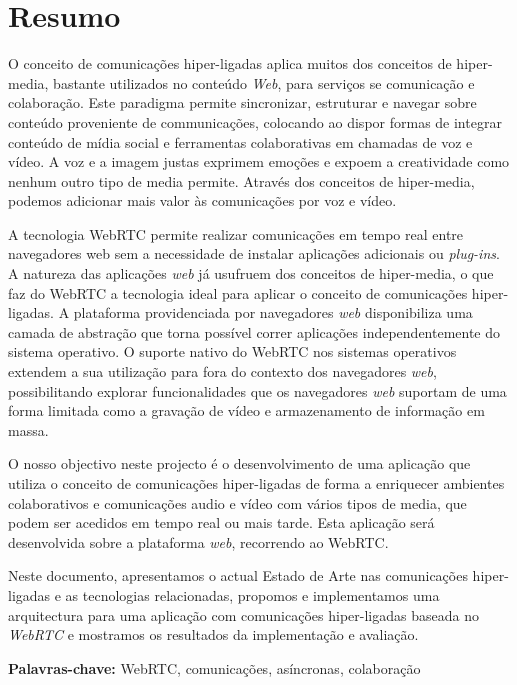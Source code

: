 \chapter*{Resumo}


O conceito de comunicações hiper-ligadas aplica muitos dos conceitos de hiper-media, bastante utilizados no conteúdo \emph{Web}, para serviços se comunicação e colaboração. Este paradigma permite sincronizar, estruturar e navegar sobre conteúdo proveniente de communicações, colocando ao dispor formas de integrar conteúdo de mídia social e ferramentas colaborativas em chamadas de voz e vídeo.
A voz e a imagem justas exprimem emoções e expoem a creatividade como nenhum outro tipo de media permite. Através dos conceitos de hiper-media, podemos adicionar mais valor às comunicações por voz e vídeo.

A tecnologia \ac{WebRTC} permite realizar comunicações em tempo real entre navegadores web sem a necessidade de instalar aplicações adicionais ou \emph{plug-ins}. A natureza das aplicações \emph{web} já usufruem dos conceitos de hiper-media, o que faz do \ac{WebRTC} a tecnologia ideal para aplicar o conceito de comunicações hiper-ligadas.
A plataforma providenciada por navegadores \emph{web} disponibiliza uma camada de abstração que torna possível correr aplicações independentemente do sistema operativo.
O suporte nativo do \ac{WebRTC} nos sistemas operativos extendem a sua utilização para fora do contexto dos navegadores \emph{web}, possibilitando explorar funcionalidades que os navegadores \emph{web} suportam de uma forma limitada como a gravação de vídeo e armazenamento de informação em massa.

O nosso objectivo neste projecto é o desenvolvimento de uma aplicação que utiliza o conceito de comunicações hiper-ligadas de forma a enriquecer ambientes colaborativos e comunicações audio e vídeo com vários tipos de media, que podem ser acedidos em tempo real ou mais tarde.
Esta aplicação será desenvolvida sobre a plataforma \emph{web}, recorrendo ao \ac{WebRTC}.

Neste documento, apresentamos o actual Estado de Arte nas comunicações hiper-ligadas e as tecnologias relacionadas, propomos e implementamos uma arquitectura para uma aplicação com comunicações hiper-ligadas baseada no \emph{WebRTC} e mostramos os resultados da implementação e avaliação.

\vspace{1cm}

\textbf{\Large Palavras-chave:} WebRTC, comunicações, asíncronas, colaboração


\cleardoublepage
